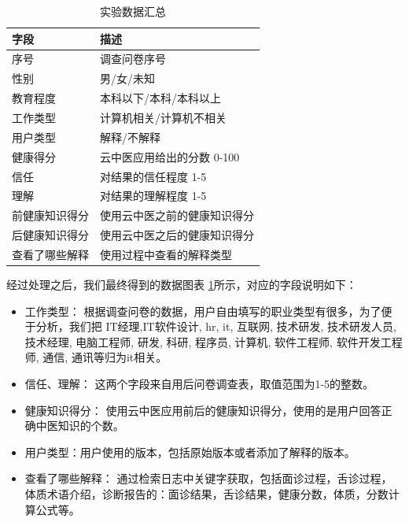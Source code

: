 \begin{table}[h]
    \centering
    \begin{tabular}{ll}
        \toprule
        字段 & 描述 \\ 
        \midrule
        序号 & 调查问卷序号 \\
        性别 & 男/女/未知 \\
        教育程度 & 本科以下/本科/本科以上 \\
        工作类型 & 计算机相关/计算机不相关 \\
        用户类型 & 解释/不解释 \\
        健康得分 & 云中医应用给出的分数 0-100 \\
        信任 & 对结果的信任程度 1-5 \\
        理解 & 对结果的理解程度 1-5 \\
        前健康知识得分 & 使用云中医之前的健康知识得分 \\
        后健康知识得分 & 使用云中医之后的健康知识得分 \\
        查看了哪些解释 & 使用过程中查看的解释类型 \\
        \bottomrule
    \end{tabular}
    \caption{实验数据汇总}
    \label{tab:exp_data}
\end{table}

经过处理之后，我们最终得到的数据图表 \ref{tab:exp_data}所示，对应的字段说明如下：

\begin{itemize}
  \item 工作类型： 根据调查问卷的数据，用户自由填写的职业类型有很多，为了便于分析，我们把 IT经理,IT软件设计, hr, it, 互联网, 技术研发, 技术研发人员, 技术经理, 电脑工程师, 研发, 科研, 程序员, 计算机, 软件工程师, 软件开发工程师, 通信, 通讯等归为it相关。

  \item  信任、理解： 这两个字段来自用后问卷调查表，取值范围为1-5的整数。

  \item  健康知识得分： 使用云中医应用前后的健康知识得分，使用的是用户回答正确中医知识的个数。

  \item  用户类型：用户使用的版本，包括原始版本或者添加了解释的版本。

  \item  查看了哪些解释： 通过检索日志中关键字获取，包括面诊过程，舌诊过程，体质术语介绍，诊断报告的：面诊结果，舌诊结果，健康分数，体质，分数计算公式等。
\end{itemize}

